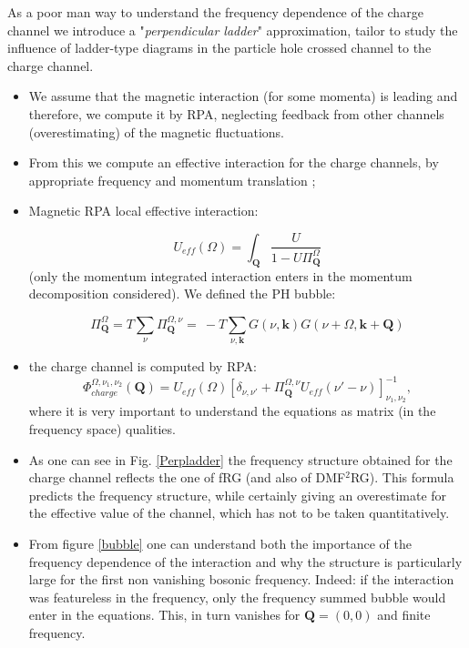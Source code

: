 As a poor man way to understand the frequency dependence of the charge channel we introduce a "\emph{perpendicular ladder}" approximation, tailor to study the influence of ladder-type diagrams in the particle hole crossed channel to the charge channel. 

\begin{itemize}
\item We assume that the magnetic interaction (for some momenta) is leading and therefore, we compute it by RPA, neglecting feedback from other channels (overestimating) of the magnetic fluctuations. 

\item From this we compute an effective interaction for the charge channels, by appropriate frequency and momentum translation ; 

\item Magnetic RPA local effective interaction:

\begin{equation}
  U_{eff}(\Omega) =\int_{\boldsymbol{Q}} \frac{U}{ 1 - U \Pi^{\Omega}_{\boldsymbol{Q}} }
\end{equation}
(only the momentum integrated interaction enters in the momentum decomposition considered). We defined 
the PH bubble:

\begin{equation}
\Pi^{\Omega}_{\boldsymbol{Q}} = T\sum_{\nu} \Pi^{\Omega,\nu}_{\boldsymbol{Q}} = \
-T\sum_{\nu,\boldsymbol{k}} G(\nu,\boldsymbol{k})G(\nu+\Omega,\boldsymbol{k}+\boldsymbol{Q})
\end{equation}

\item the charge channel is computed by RPA: 
\begin{equation}
  \Phi_{charge}^{\Omega,\nu_1,\nu_2}(\boldsymbol{Q}) = U_{eff}(\Omega) 
  \left[ \delta_{\nu,\nu'}+  \Pi^{\Omega,\nu}_{\boldsymbol{Q}} U_{eff}(\nu'-\nu) \right]_{\nu_1,\nu_2}^{-1},
\end{equation}
where it is very important to understand the equations as matrix (in the frequency space) qualities. 

\item As one can see in Fig. \ref{Perpladder} the frequency structure obtained for the charge channel reflects the one of fRG (and also of DMF$^2$RG). 
This formula predicts the frequency structure, while certainly giving an overestimate for the effective value of the channel, which has not  to be taken quantitatively. 

\item From figure \ref{bubble} one can understand both the importance of the frequency dependence of the interaction and why the structure is particularly large for the first non vanishing bosonic frequency. 
Indeed: if the interaction was featureless in the frequency, only the frequency summed bubble would enter in the equations. This, in turn vanishes for $\mathbf{Q}=(0,0)$ and finite frequency.  

\end{itemize}

